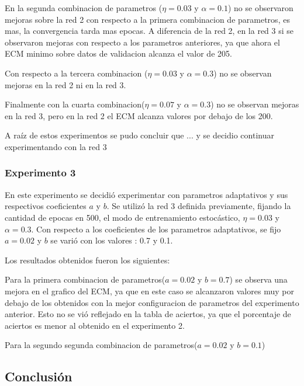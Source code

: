 En la segunda combinacion de parametros ($\eta = 0.03$ y $\alpha = 0.1$) no se observaron mejoras sobre la red 2 con respecto a la primera combinacion
de parametros, es mas, la convergencia tarda mas epocas. A diferencia de la red 2, en la red 3 si se observaron mejoras con respecto a los parametros
anteriores, ya que ahora el ECM minimo sobre datos de validacion alcanza el valor de 205.

Con respecto a la tercera combinacion ($\eta = 0.03$ y $\alpha = 0.3$) no se observan mejoras en la red 2 ni en la red 3.

Finalmente con la cuarta combinacion($\eta = 0.07$ y $\alpha = 0.3$) no se observan mejoras en la red 3, pero en la red 2 el ECM alcanza valores por
debajo de los 200.

A raíz de estos experimentos se pudo concluir que ... y se decidio continuar experimentando con la red 3

\subsubsection{Experimento 3}
En este experimento se decidió experimentar con parametros adaptativos y sus respectivos coeficientes $a$ y $b$. Se utilizó la red 3 definida
previamente, fijando la cantidad de epocas en 500, el modo de entrenamiento estocástico, $\eta = 0.03$ y $\alpha = 0.3$. Con respecto a los coeficientes
de los parametros adaptativos, se fijo $a = 0.02$ y $b$ se varió con los valores : 0.7 y 0.1.

Los resultados obtenidos fueron los siguientes:


Para la primera combinacion de parametros($a = 0.02$ y $b = 0.7$) se observa una mejora en el grafico del ECM, ya que en este caso se alcanzaron valores
muy por debajo de los obtenidos con la mejor configuracion de parametros del experimento anterior. Esto no se vió reflejado en la tabla de aciertos, ya
que el porcentaje de aciertos es menor al obtenido en el experimento 2.

Para la segundo segunda combinacion de parametros($a = 0.02$ y $b = 0.1$) 

\subsection{Conclusión}

\newpage
